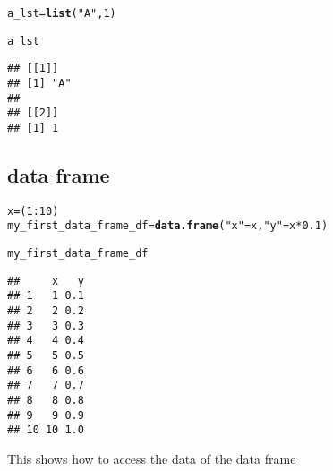 \documentclass[a4paper,10pt]{book}\usepackage[]{graphicx}\usepackage[]{color}
\makeatletter
\newcommand{\hlnum}[1]{\textcolor[rgb]{0.686,0.059,0.569}{#1}}%
\newcommand{\hlstr}[1]{\textcolor[rgb]{0.192,0.494,0.8}{#1}}%
\newcommand{\hlopt}[1]{\textcolor[rgb]{0,0,0}{#1}}%
\newcommand{\hlstd}[1]{\textcolor[rgb]{0.345,0.345,0.345}{#1}}%
\newcommand{\hlkwb}[1]{\textcolor[rgb]{0.69,0.353,0.396}{#1}}%
\newcommand{\hlkwd}[1]{\textcolor[rgb]{0.737,0.353,0.396}{\textbf{#1}}}%
\newenvironment{kframe}{%
 \def\at@end@of@kframe{}%
 \ifinner\ifhmode%
  \def\at@end@of@kframe{\end{minipage}}%
  \begin{minipage}{\columnwidth}%
 \fi\fi%
 \def\FrameCommand##1{\hskip\@totalleftmargin \hskip-\fboxsep
 \colorbox{shadecolor}{##1}\hskip-\fboxsep
     \hskip-\linewidth \hskip-\@totalleftmargin \hskip\columnwidth}%
 \MakeFramed {\advance\hsize-\width
   \@totalleftmargin\z@ \linewidth\hsize
   \@setminipage}}%
 {\par\unskip\endMakeFramed%
 \at@end@of@kframe}
\newenvironment{knitrout}{}{} %
\makeatother
\begin{document}
\begin{knitrout}
\color{fgcolor}\begin{kframe}
\begin{alltt}
\hlstd{a_lst} \hlkwb{=} \hlkwd{list}\hlstd{(}\hlstr{"A"}\hlstd{,} \hlnum{1}\hlstd{)}

\hlstd{a_lst}
\end{alltt}
\begin{verbatim}
## [[1]]
## [1] "A"
## 
## [[2]]
## [1] 1
\end{verbatim}
\end{kframe}
\end{knitrout}


\subsection{data frame}

\begin{knitrout}
\color{fgcolor}\begin{kframe}
\begin{alltt}
\hlstd{x} \hlkwb{=} \hlstd{(}\hlnum{1}\hlopt{:}\hlnum{10}\hlstd{)}
\hlstd{my_first_data_frame_df} \hlkwb{=} \hlkwd{data.frame}\hlstd{(}\hlstr{"x"}\hlstd{=x,} \hlstr{"y"}\hlstd{=x}\hlopt{*}\hlnum{0.1} \hlstd{)}

\hlstd{my_first_data_frame_df}
\end{alltt}
\begin{verbatim}
##     x   y
## 1   1 0.1
## 2   2 0.2
## 3   3 0.3
## 4   4 0.4
## 5   5 0.5
## 6   6 0.6
## 7   7 0.7
## 8   8 0.8
## 9   9 0.9
## 10 10 1.0
\end{verbatim}
\end{kframe}
\end{knitrout}

This shows how to access the data of the data frame
\end{document}
